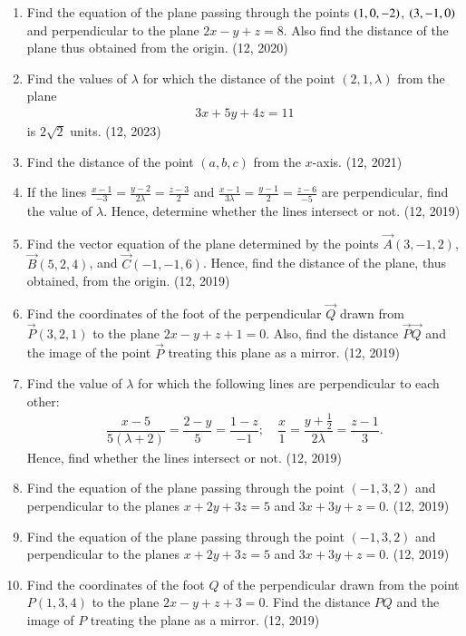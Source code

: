 \begin{enumerate}[label=\thesubsection.\arabic*, ref=\thesubsection.\theenumi]
\item Find the equation of the plane passing through the points $\left(1, 0, -2\right)$,  $\left(3, -1, 0\right)$ and perpendicular to the plane $2x - y + z = 8$. Also find the distance of the plane thus obtained from the origin.
\hfill (12, 2020)
    \item Find the values of $\lambda$ for which the distance of the point $(2, 1, \lambda)$ from the plane
    \begin{align}
        3x + 5y + 4z = 11
    \end{align}
    is $2\sqrt{2}$ units.
    \hfill (12, 2023)
	\item Find the distance of the point $(a, b, c)$ from the $x$-axis. \hfill (12, 2021)
	\item If the lines $\frac{x-1}{-3} = \frac{y-2}{2\lambda} = \frac{z-3}{2}$ and $\frac{x-1}{3\lambda} = \frac{y-1}{2} = \frac{z-6}{-5}$ are perpendicular, find the value of $\lambda$. Hence, determine whether the lines intersect or not. \hfill (12, 2019)
	\item Find the vector equation of the plane determined by the points $\vec{A}(3, -1, 2)$, $\vec{B}(5, 2, 4)$, and $\vec{C}(-1, -1, 6)$. Hence, find the distance of the plane, thus obtained, from the origin. \hfill (12, 2019)
	\item Find the coordinates of the foot of the perpendicular $\vec{Q}$ drawn from $\vec{P}(3, 2, 1)$ to the plane $2x - y + z + 1 = 0$. Also, find the distance $\vec{P}\vec{Q}$ and the image of the point $\vec{P}$ treating this plane as a mirror. \hfill (12, 2019)
	\item Find the value of $\lambda$ for which the following lines are perpendicular to each other:
	\begin{align*}
	\dfrac{x-5}{5(\lambda+2)} = \dfrac{2-y}{5} = \dfrac{1-z}{-1}; \quad \dfrac{x}{1} = \dfrac{y + \frac{1}{2}}{2\lambda} = \dfrac{z-1}{3}.
	\end{align*}
	Hence, find whether the lines intersect or not. \hfill (12, 2019)
	\item Find the equation of the plane passing through the point $(-1, 3, 2)$ and perpendicular to the planes $x + 2y + 3z = 5$ and $3x + 3y + z = 0$. \hfill (12, 2019)
	\item Find the equation of the plane passing through the point $(-1, 3, 2)$ and perpendicular to the planes $x + 2y + 3z = 5$ and $3x + 3y + z = 0$. \hfill (12, 2019)
	
	\item Find the coordinates of the foot $Q$ of the perpendicular drawn from the point $P(1, 3, 4)$ to the plane $2x - y + z + 3 = 0$. Find the distance $PQ$ and the image of $P$ treating the plane as a mirror. \hfill (12, 2019)
	
	

\end{enumerate}
